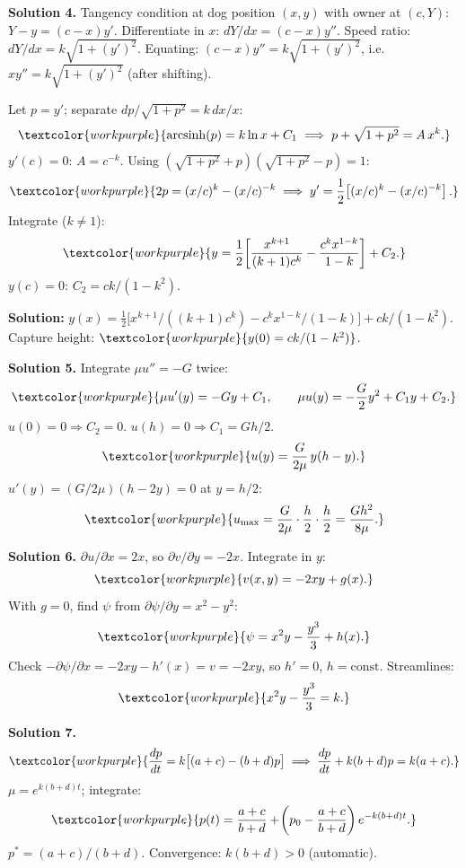 \medskip

\noindent\textbf{Solution 4.}\quad
Tangency condition at dog position $(x,y)$ with owner at $(c,Y)$:
$Y - y = (c-x)y'$. Differentiate in $x$: $dY/dx = (c-x)y''$.
Speed ratio: $dY/dx = k\sqrt{1+(y')^2}$.
Equating: $(c-x)y'' = k\sqrt{1+(y')^2}$, i.e.\ $xy'' = k\sqrt{1+(y')^2}$
(after shifting).

Let $p = y'$; separate $dp/\sqrt{1+p^2} = k\,dx/x$:
\[
  \textcolor{workpurple}{\operatorname{arcsinh}(p) = k\ln x + C_1
  \;\Longrightarrow\;
  p + \sqrt{1+p^2} = A\,x^k.}
\]
$y'(c) = 0$: $A = c^{-k}$. Using $(\sqrt{1+p^2}+p)(\sqrt{1+p^2}-p) = 1$:
\[
  \textcolor{workpurple}{2p = (x/c)^k - (x/c)^{-k}
  \;\Longrightarrow\;
  y' = \frac{1}{2}\!\left[(x/c)^k - (x/c)^{-k}\right].}
\]
Integrate ($k \ne 1$):
\[
  \textcolor{workpurple}{y = \frac{1}{2}\!\left[\frac{x^{k+1}}{(k+1)c^k}
  - \frac{c^k x^{1-k}}{1-k}\right] + C_2.}
\]
$y(c) = 0$: $C_2 = ck/(1-k^2)$.

\textbf{Solution:}
$y(x) = \tfrac{1}{2}\bigl[x^{k+1}/((k+1)c^k) - c^k x^{1-k}/(1-k)\bigr] + ck/(1-k^2)$.
Capture height: $\textcolor{workpurple}{y(0) = ck/(1-k^2)}$.

\medskip

\noindent\textbf{Solution 5.}\quad
Integrate $\mu u'' = -G$ twice:
\[
  \textcolor{workpurple}{\mu u'(y) = -Gy + C_1,
  \qquad
  \mu u(y) = -\frac{G}{2}y^2 + C_1 y + C_2.}
\]
$u(0) = 0 \Rightarrow C_2 = 0$.\quad
$u(h) = 0 \Rightarrow C_1 = Gh/2$.
\[
  \textcolor{workpurple}{u(y) = \frac{G}{2\mu}\,y(h-y).}
\]
$u'(y) = (G/2\mu)(h-2y) = 0$ at $y = h/2$:
\[
  \textcolor{workpurple}{u_{\max} = \frac{G}{2\mu}\cdot\frac{h}{2}\cdot\frac{h}{2}
  = \frac{Gh^2}{8\mu}.}
\]

\medskip

\noindent\textbf{Solution 6.}\quad
$\partial u/\partial x = 2x$, so $\partial v/\partial y = -2x$.
Integrate in $y$:
\[
  \textcolor{workpurple}{v(x,y) = -2xy + g(x).}
\]
With $g = 0$, find $\psi$ from $\partial\psi/\partial y = x^2 - y^2$:
\[
  \textcolor{workpurple}{\psi = x^2 y - \frac{y^3}{3} + h(x).}
\]
Check $-\partial\psi/\partial x = -2xy - h'(x) = v = -2xy$,
so $h' = 0$, $h = \text{const}$. Streamlines:
\[
  \textcolor{workpurple}{x^2 y - \frac{y^3}{3} = k.}
\]

\medskip

\noindent\textbf{Solution 7.}\quad
\[
  \textcolor{workpurple}{\frac{dp}{dt} = k\bigl[(a+c)-(b+d)p\bigr]
  \;\Longrightarrow\;
  \frac{dp}{dt} + k(b+d)p = k(a+c).}
\]
$\mu = e^{k(b+d)t}$; integrate:
\[
  \textcolor{workpurple}{p(t) = \frac{a+c}{b+d}
  + \!\left(p_0 - \frac{a+c}{b+d}\right)e^{-k(b+d)t}.}
\]
$p^* = (a+c)/(b+d)$. Convergence: $k(b+d) > 0$ (automatic). \checkmark

